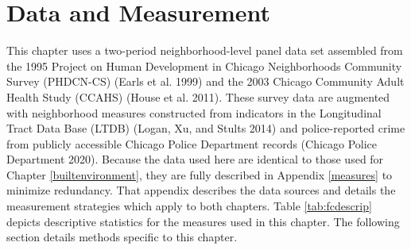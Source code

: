 \documentclass [11pt, proquest] {uwthesis}[2015/03/03]
\begin{document}
\hypertarget{data-and-measurement}{%
\section{Data and Measurement}\label{data-and-measurement}}

This chapter uses a two-period neighborhood-level panel data set assembled from the 1995 Project on Human Development in Chicago Neighborhoods Community Survey (PHDCN-CS) (Earls et al. 1999) and the 2003 Chicago Community Adult Health Study (CCAHS) (House et al. 2011). These survey data are augmented with neighborhood measures constructed from indicators in the Longitudinal Tract Data Base (LTDB) (Logan, Xu, and Stults 2014) and police-reported crime from publicly accessible Chicago Police Department records ({Chicago Police Department} 2020). Because the data used here are identical to those used for Chapter \ref{builtenvironment}, they are fully described in Appendix \ref{measures} to minimize redundancy. That appendix describes the data sources and details the measurement strategies which apply to both chapters. Table \ref{tab:fcdescrip} depicts descriptive statistics for the measures used in this chapter. The following section details methods specific to this chapter.

\providecommand{\docline}[3]{\noalign{\global\setlength{\arrayrulewidth}{#1}}\arrayrulecolor[HTML]{#2}\cline{#3}}

\setlength{\tabcolsep}{2pt}
\end{document}
